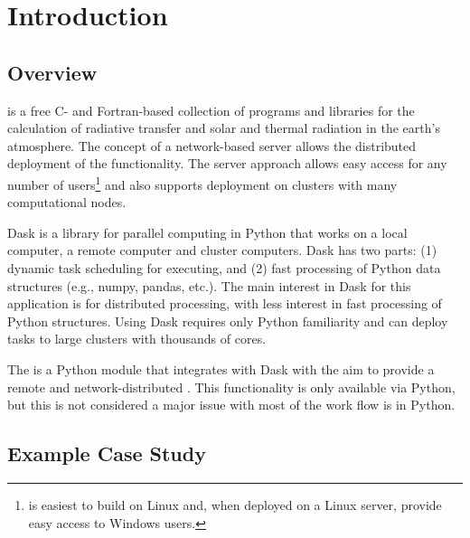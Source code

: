 
\chapter{Introduction}
\label{chap:Introduction}

\section{Overview}
\label{sec:introductionOverview}

\libradtran{} \cite{EmdeLibRadtran2016,libRadtran2005} is a free C- and Fortran-based collection of programs and libraries for the calculation of radiative transfer and solar and thermal radiation in the earth's atmosphere.
The concept of a network-based \libradtran{} server allows the  distributed deployment of the \libradtran{} functionality. The server approach allows easy access for any number of users\footnote{\libradtran{} is easiest to build on Linux and, when deployed on a Linux server, provide easy access to Windows users.} and also supports deployment on clusters with many computational nodes.

Dask \cite{daskhomepage2020} is a library for parallel computing in Python that works on a local computer, a remote computer and cluster computers.
Dask has two parts: (1) dynamic task scheduling for executing, and (2) fast processing of Python data structures (e.g., numpy, pandas, etc.).  The main interest in Dask for this application is for distributed  processing, with less interest in fast processing of Python structures. Using Dask requires only Python familiarity and can deploy tasks to large clusters with thousands of cores.

The \libraddask{}  is a Python module that integrates \libradtran{} with Dask with the aim to provide a remote and network-distributed \libradtran{}. This functionality is only available via Python, but this is not considered a major issue with most of the work flow is in Python.

\section{Example Case Study}

